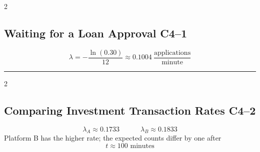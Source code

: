 {\begin{multicols}{2}
			\subsection{Waiting for a Loan Approval \hfill C4--1}
			\[
			\boxed{\lambda=-\frac{\ln(0.30)}{12}
			\approx0.1004\ \frac{\text{applications}}{\text{minute}}}
			\]

		\end{multicols}

		\noindent\rule{\textwidth}{0.5pt}

		\begin{multicols}{2}
			\subsection{Comparing Investment Transaction Rates \hfill C4--2}
			\[
			\lambda_A\approx0.1733
			\qquad \quad 
			\lambda_B\approx0.1833
			\]
			Platform B has the higher rate; the expected counts differ by one after
			\[
			\boxed{t\approx100\text{ minutes}}
			\]
		\end{multicols}
	}

	

